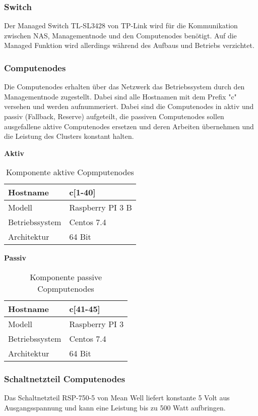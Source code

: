\subsubsection{Switch}
Der Managed Switch TL-SL3428 von TP-Link wird für die Kommunikation zwischen NAS, Managementnode und den Computenodes benötigt. Auf die Managed Funktion wird allerdings während des Aufbaus und Betriebs verzichtet.

\subsubsection{Computenodes}
Die Computenodes erhalten über das Netzwerk das Betriebssystem durch den Managementnode zugestellt. Dabei sind alle Hostnamen mit dem Prefix "c" versehen und werden aufnummeriert. Dabei sind die Computenodes in aktiv und passiv (Fallback, Reserve) aufgeteilt, die passiven Computenodes sollen ausgefallene aktive Computenodes ersetzen und deren Arbeiten übernehmen und die Leistung des Clusters konstant halten.

\textbf{Aktiv}
\begin{table}[H]
\centering
\begin{tabular}{|l|l|}
\hline
Hostname & c[1-40] \\\hline
Modell & Raspberry PI 3 B\\\hline
Betriebssystem & Centos 7.4 \\\hline
Architektur & 64 Bit \\\hline
\end{tabular}
\caption{Komponente aktive Copmputenodes}
\end{table}

\textbf{Passiv}
\begin{table}[H]
\centering
\begin{tabular}{|l|l|}
\hline
Hostname & c[41-45] \\\hline
Modell & Raspberry PI 3 \\\hline
Betriebssystem & Centos 7.4 \\\hline
Architektur & 64 Bit \\\hline
\end{tabular}
\caption{Komponente passive Copmputenodes}
\end{table}

\subsubsection{Schaltnetzteil Computenodes}
Das Schaltnetzteil RSP-750-5 von Mean Well liefert konstante 5 Volt aus Ausgangsspannung und kann eine Leistung bis zu 500 Watt aufbringen.

